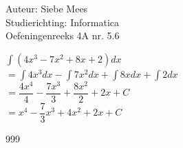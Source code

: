 \documentclass[a4paper]{article}
\begin{document}
  
\noindent \large Auteur: Siebe Mees \\
\noindent \large Studierichting: Informatica\\
\noindent \large Oefeningenreeks 4A nr. 5.6\\

\medskip

\normalsize

$ \displaystyle\int (4x^3 - 7x^2 + 8x + 2)dx $\\

$ = \displaystyle\int 4x^3dx - \displaystyle\int 7x^2dx + \displaystyle\int 8xdx + \displaystyle\int 2dx $\\

$ = \dfrac{4x^4}{4} - \dfrac{7x^3}{3} + \dfrac{8x^2}{2} + 2x + C $\\

$ = x^4 - \dfrac{7}{3}x^3 + 4x^2 + 2x + C $\\

\begin{thebibliography}{999}
\end{thebibliography}
\end{document}

